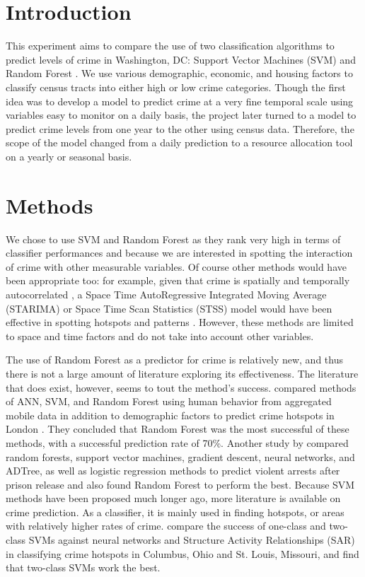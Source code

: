 \documentclass [a4paper,12 pt]{article}
\begin{document}
\section{Introduction}
This experiment aims to compare the use of two classification algorithms to predict levels of crime in Washington, DC: Support Vector Machines (SVM) \citep{vapnik1974theory} and Random Forest \citep{breiman2001random}. We use various demographic, economic, and housing factors to classify census tracts into either high or low crime categories. Though the first idea was to develop a model to predict crime at a very fine temporal scale using variables easy to monitor on a daily basis, the project later turned to a model to predict crime levels from one year to the other using census data. Therefore, the scope of the model changed from a daily prediction to a resource allocation tool on a yearly or seasonal basis.


\section{Methods}\label{methods}
We chose to use SVM and Random Forest as they rank very high in terms of classifier performances \citep{fernandez2014we} and because we are interested in spotting the interaction of crime with other measurable variables. Of course other methods would have been appropriate too: for example, given that crime is spatially and temporally autocorrelated \citep{anselin2000spatial}, a Space Time AutoRegressive Integrated Moving Average (STARIMA) or Space Time Scan Statistics (STSS) model would have been effective in spotting hotspots and patterns \citep{olligschlaeger1997spatio}. However, these methods are limited to space and time factors and do not take into account other variables. 
 
The use of Random Forest as a predictor for crime is relatively new, and thus there is not a large amount of literature exploring its effectiveness. The literature that does exist, however, seems to tout the method's success. \cite{bogomolov2014once} compared methods of ANN, SVM, and Random Forest using human behavior from aggregated mobile data in addition to demographic factors to predict crime hotspots in London \citep{bogomolov2014once}. They concluded that Random Forest was the most successful of these methods, with a successful prediction rate of 70\%. Another study by \cite{breitenbachcreating} compared random forests, support vector machines, gradient descent, neural networks, and ADTree, as well as logistic regression methods to predict violent arrests after prison release and also found Random Forest to perform the best. Because SVM methods have been proposed much longer ago, more literature is available on crime prediction. As a classifier, it is mainly used in finding hotspots, or areas with relatively higher rates of crime. \cite{kianmehr2008effectiveness} compare the success of one-class and two-class SVMs against neural networks and Structure Activity Relationships (SAR) in classifying crime hotspots in Columbus, Ohio and St. Louis, Missouri, and find that two-class SVMs work the best.
\end{document}
